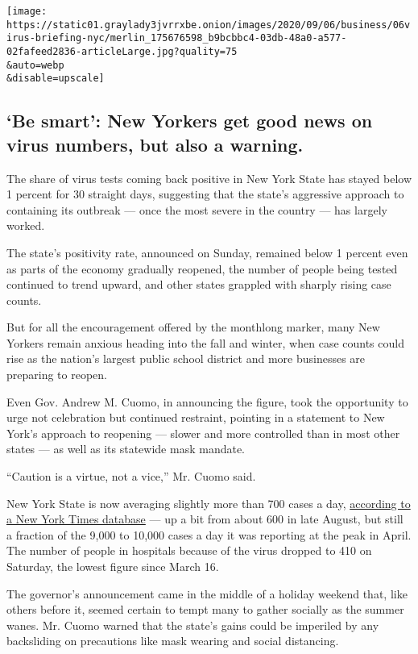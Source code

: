 \texttt{[image: https://static01.graylady3jvrrxbe.onion/images/2020/09/06/business/06virus-briefing-nyc/merlin\_175676598\_b9bcbbc4-03db-48a0-a577-02fafeed2836-articleLarge.jpg?quality=75\\\&auto=webp\\\&disable=upscale]}

\hypertarget{be-smart-new-yorkers-get-good-news-on-virus-numbers-but-also-a-warning}{%
\subsection{`Be smart': New Yorkers get good news on virus numbers, but
also a
warning.}\label{be-smart-new-yorkers-get-good-news-on-virus-numbers-but-also-a-warning}}

The share of virus tests coming back positive in New York State has
stayed below 1 percent for 30 straight days, suggesting that the state's
aggressive approach to containing its outbreak --- once the most severe
in the country --- has largely worked.

The state's positivity rate, announced on Sunday, remained below 1
percent even as parts of the economy gradually reopened, the number of
people being tested continued to trend upward, and other states grappled
with sharply rising case counts.

But for all the encouragement offered by the monthlong marker, many New
Yorkers remain anxious heading into the fall and winter, when case
counts could rise as the nation's largest public school district and
more businesses are preparing to reopen.

Even Gov. Andrew M. Cuomo, in announcing the figure, took the
opportunity to urge not celebration but continued restraint, pointing in
a statement to New York's approach to reopening --- slower and more
controlled than in most other states --- as well as its statewide mask
mandate.

``Caution is a virtue, not a vice,'' Mr. Cuomo said.

New York State is now averaging slightly more than 700 cases a day,
\href{https://www.nytimes3xbfgragh.onion/interactive/2020/us/new-york-coronavirus-cases.html}{according
to a New York Times database} --- up a bit from about 600 in late
August, but still a fraction of the 9,000 to 10,000 cases a day it was
reporting at the peak in April. The number of people in hospitals
because of the virus dropped to 410 on Saturday, the lowest figure since
March 16.

The governor's announcement came in the middle of a holiday weekend
that, like others before it, seemed certain to tempt many to gather
socially as the summer wanes. Mr. Cuomo warned that the state's gains
could be imperiled by any backsliding on precautions like mask wearing
and social distancing.

